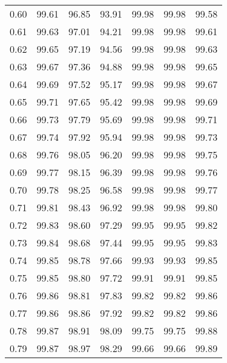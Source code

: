 \begin{tabular}{|c|c|c|c|c|c|c|}
      0.60 &     99.61 &     96.85 &      93.91 &   99.98 &      99.98 &         99.58 \\
      0.61 &     99.63 &     97.01 &      94.21 &   99.98 &      99.98 &         99.61 \\
      0.62 &     99.65 &     97.19 &      94.56 &   99.98 &      99.98 &         99.63 \\
      0.63 &     99.67 &     97.36 &      94.88 &   99.98 &      99.98 &         99.65 \\
      0.64 &     99.69 &     97.52 &      95.17 &   99.98 &      99.98 &         99.67 \\
      0.65 &     99.71 &     97.65 &      95.42 &   99.98 &      99.98 &         99.69 \\
      0.66 &     99.73 &     97.79 &      95.69 &   99.98 &      99.98 &         99.71 \\
      0.67 &     99.74 &     97.92 &      95.94 &   99.98 &      99.98 &         99.73 \\
      0.68 &     99.76 &     98.05 &      96.20 &   99.98 &      99.98 &         99.75 \\
      0.69 &     99.77 &     98.15 &      96.39 &   99.98 &      99.98 &         99.76 \\
      0.70 &     99.78 &     98.25 &      96.58 &   99.98 &      99.98 &         99.77 \\
      0.71 &     99.81 &     98.43 &      96.92 &   99.98 &      99.98 &         99.80 \\
      0.72 &     99.83 &     98.60 &      97.29 &   99.95 &      99.95 &         99.82 \\
      0.73 &     99.84 &     98.68 &      97.44 &   99.95 &      99.95 &         99.83 \\
      0.74 &     99.85 &     98.78 &      97.66 &   99.93 &      99.93 &         99.85 \\
      0.75 &     99.85 &     98.80 &      97.72 &   99.91 &      99.91 &         99.85 \\
      0.76 &     99.86 &     98.81 &      97.83 &   99.82 &      99.82 &         99.86 \\
      0.77 &     99.86 &     98.86 &      97.92 &   99.82 &      99.82 &         99.86 \\
      0.78 &     99.87 &     98.91 &      98.09 &   99.75 &      99.75 &         99.88 \\
      0.79 &     99.87 &     98.97 &      98.29 &   99.66 &      99.66 &         99.89 \\

\end{tabular}
